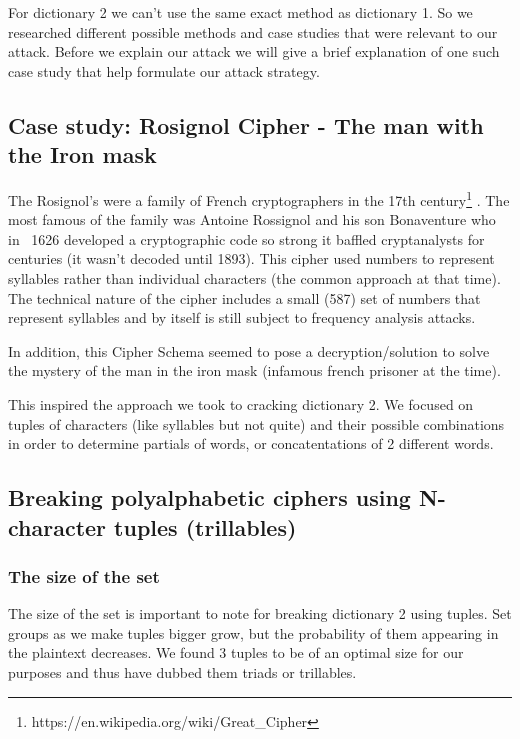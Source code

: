 \documentclass[pdftex,12pt,letter]{article}
\begin{document}
For dictionary 2 we can't use the same exact method as dictionary 1.
So we researched different possible methods and case studies that were 
relevant to our attack. Before we explain our attack we will give a 
brief explanation of one such case study that help formulate our attack
strategy.  

\subsection{Case study: Rosignol Cipher - The man with the Iron mask}

The Rosignol's were a family of French cryptographers in the 17th
century\footnote{ https://en.wikipedia.org/wiki/Great\_Cipher} .  The most
famous of the family was Antoine Rossignol and his son Bonaventure who in ~1626
developed a cryptographic code so strong it baffled cryptanalysts for centuries
(it wasn't decoded until 1893). This cipher used numbers to represent syllables
rather than individual characters (the common approach at that time).  The
technical nature of the cipher includes a small (587) set of numbers that
represent syllables and by itself is still subject to frequency analysis
attacks. 

In addition, this Cipher Schema seemed to pose a decryption/solution to solve the 
mystery of the man in the iron mask (infamous french prisoner at the time). 

This inspired the approach we took to cracking dictionary 2. We focused on 
tuples of characters (like syllables but not quite) and their possible combinations
in order to determine partials of words, or concatentations of 2 different words. 

\subsection{Breaking polyalphabetic ciphers using N-character tuples (trillables)}

\subsubsection{The size of the set}

The size of the set is important to note for breaking dictionary 2 using
tuples.  Set groups as we make tuples bigger grow, but the probability of them
appearing in the plaintext decreases. We found 3 tuples to be of an optimal
size for our purposes and thus have dubbed them triads or trillables. 
\end{document}
